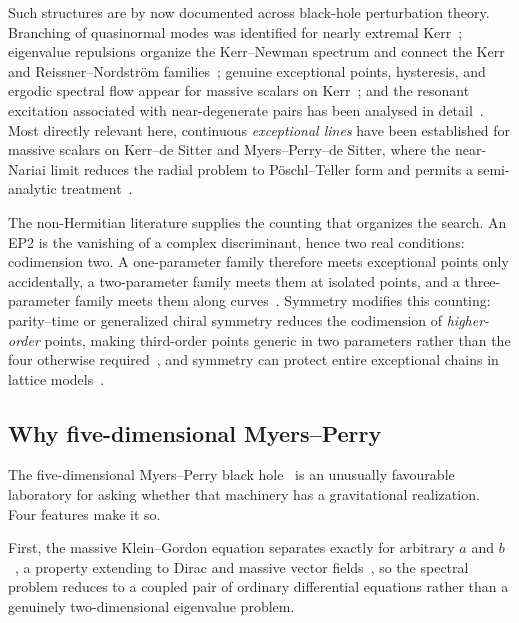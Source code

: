 \documentclass[aps,prd,reprint,superscriptaddress,nofootinbib,longbibliography]{revtex4-2}
\theoremstyle{plain}
\theoremstyle{definition}
\theoremstyle{remark}
\begin{document}
Such structures are by now documented across black-hole perturbation theory.
Branching of quasinormal modes was identified for nearly extremal
Kerr~\cite{Yangetal2012B18}; eigenvalue repulsions organize the Kerr--Newman
spectrum and connect the Kerr and Reissner--Nordstr\"om
families~\cite{Diasetal2021B19,Dias2022B20,Davey2023B21}; genuine exceptional
points, hysteresis, and ergodic spectral flow appear for massive scalars on
Kerr~\cite{Cavalcante2024B22,Cavalcante2024B23,Cavalcante2025B29}; and the
resonant excitation associated with near-degenerate pairs has been analysed in
detail~\cite{Oshita2025B25,Yang2025B26,Kubota2025B27,Caoetal2025B28,%
Wang2026B32}. Most directly relevant here, continuous \emph{exceptional lines}
have been established for massive scalars on Kerr--de Sitter and
Myers--Perry--de Sitter, where the near-Nariai limit reduces the radial problem
to P\"oschl--Teller form and permits a semi-analytic
treatment~\cite{Nakamoto2026A17,Daveyetal2022A13,Ponglertsakul2020A12}.

The non-Hermitian literature supplies the counting that organizes the search.
An EP2 is the vanishing of a complex discriminant, hence two real conditions:
codimension two. A one-parameter family therefore meets exceptional points only
accidentally, a two-parameter family meets them at isolated points, and a
three-parameter family meets them along curves~\cite{Bergholtz2019E63}. Symmetry
modifies this counting: parity--time or generalized chiral symmetry reduces the
codimension of \emph{higher-order} points, making third-order points generic in
two parameters rather than the four otherwise
required~\cite{Mandal2021E65}, and symmetry can protect entire exceptional
chains in lattice models~\cite{Zhangetal2022E66}.

\subsection{Why five-dimensional Myers--Perry}\label{sec:intro:why}

The five-dimensional Myers--Perry black hole~\cite{Myers1986A01,Emparan2008A02}
is an unusually favourable laboratory for asking whether that machinery has a
gravitational realization. Four features make it so.

First, the massive Klein--Gordon equation separates exactly for arbitrary $a$
and $b$~\cite{Murata2007A03,Wu2008A04}, a property extending to Dirac and
massive vector fields~\cite{Wu2008A04,Frolovetal2018A09}, so the spectral
problem reduces to a coupled pair of ordinary differential equations rather than
a genuinely two-dimensional eigenvalue problem.
\end{document}
